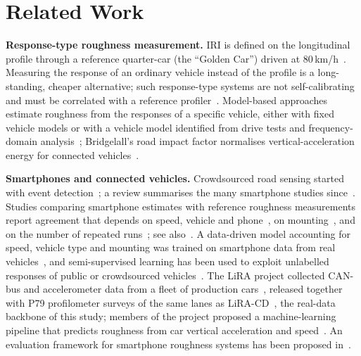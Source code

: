 \section{Related Work}
\label{sec:related}

\textbf{Response-type roughness measurement.}
IRI is defined on the longitudinal profile through a reference quarter-car (the ``Golden Car'') driven at 80\,km/h~\cite{sayers1986tp45,sayers1995iri,astm_e1926}.
Measuring the response of an ordinary vehicle instead of the profile is a long-standing, cheaper alternative; such response-type systems are not self-calibrating and must be correlated with a reference profiler~\cite{sayers1986tp46}.
Model-based approaches estimate roughness from the responses of a specific vehicle, either with fixed vehicle models or with a vehicle model identified from drive tests and frequency-domain analysis~\cite{gonzalez2008accel,zhao2017freq}; Bridgelall's road impact factor normalises vertical-acceleration energy for connected vehicles~\cite{bridgelall2014rif}.

\textbf{Smartphones and connected vehicles.}
Crowdsourced road sensing started with event detection~\cite{eriksson2008pothole,mohan2008nericell}; a review summarises the many smartphone studies since~\cite{sattar2018review}.
Studies comparing smartphone estimates with reference roughness measurements report agreement that depends on speed, vehicle and phone~\cite{thilak2021}, on mounting~\cite{mounting2026}, and on the number of repeated runs~\cite{opara2022roughness}; see also~\cite{hanson2014iri}.
A data-driven model accounting for speed, vehicle type and mounting was trained on smartphone data from real vehicles~\cite{sang2024iri}, and semi-supervised learning has been used to exploit unlabelled responses of public or crowdsourced vehicles~\cite{zhang2026semisup,trc2021crowd}.
The LiRA project collected CAN-bus and accelerometer data from a fleet of production cars~\cite{levenberg2021lira}, released together with P79 profilometer surveys of the same lanes as LiRA-CD~\cite{skar2023lira}, the real-data backbone of this study; members of the project proposed a machine-learning pipeline that predicts roughness from car vertical acceleration and speed~\cite{bajic2021ml}.
An evaluation framework for smartphone roughness systems has been proposed in~\cite{evalframework2023}.

